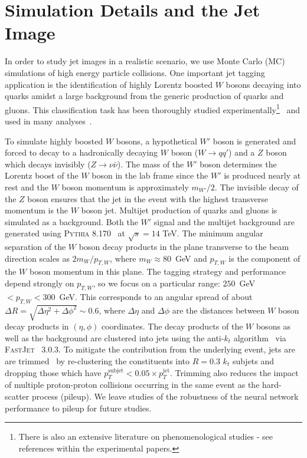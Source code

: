 \section{Simulation Details and the Jet Image}
\label{sec:simulation}

In order to study jet images in a realistic scenario, we use Monte Carlo (MC) simulations of high energy particle collisions. One important jet tagging application is the identification of highly Lorentz boosted $W$ bosons decaying into quarks amidst a large background from the generic production of quarks and gluons.  This classification task has been thoroughly studied experimentally\footnote{There is also an extensive literature on phenomenological studies - see references within the experimental papers.}~\cite{Khachatryan:2014vla,ATL-PHYS-PUB-2015-033,ATL-PHYS-PUB-2014-004} and used in many analyses~\cite{Aad:2015owa,Khachatryan:2014hpa,Khachatryan:2015mta,Khachatryan:2015oba,Khachatryan:2015gza,Khachatryan:2015bma,Khachatryan:2015cwa,Khachatryan:2015ywa,Aad:2014wea,Aad:2015agg,Aad:2015kna,Aad:2015ufa,Aad:2014haa}.  

To simulate highly boosted $W$ bosons, a hypothetical $W'$ boson is generated and forced to decay to a hadronically decaying $W$ boson ($W\rightarrow qq'$) and a $Z$ boson which decays invisibly ($Z\rightarrow \nu\bar{\nu}$).  The mass of the $W'$ boson determines the Lorentz boost of the $W$ boson in the lab frame since the $W'$ is produced nearly at rest and the $W$ boson momentum is approximately $m_{W'}/2$.  The invisible decay of the $Z$ boson ensures that the jet in the event with the highest transverse momentum is the $W$ boson jet.  Multijet production of quarks and gluons is simulated as a background.  Both the $W'$ signal and the multijet background are generated using \textsc{Pythia} 8.170~\cite{Pythia8,Pythia} at $\sqrt{s}=14$ TeV.  The minimum angular separation of the $W$ boson decay products in the plane transverse to the beam direction scales as $2m_{W}/p_{T,W}$, where $m_W\approx 80$~GeV and $p_{T,W}$ is the component of the $W$ boson momentum in this plane.  The tagging strategy and performance depend strongly on $p_{T,W}$, so we focus on a particular range: $250$~GeV~$<p_{T,W}<300$~GeV.  This corresponds to an angular spread of about $\Delta R = \sqrt{ \Delta \eta^2 + \Delta \phi^2} \sim 0.6$, where $\Delta \eta$ and $\Delta \phi$ are the distances between $W$ boson decay products in $(\eta, \phi)$ coordinates.  The decay products of the $W$ bosons as well as the background are clustered into jets using the anti-$k_t$ algorithm~\cite{antiktpaper} via \textsc{FastJet}~\cite{fastjet} 3.0.3.  To mitigate the contribution from the underlying event, jets are are trimmed~\cite{trimming} by re-clustering the constituents into $R=0.3$ $k_t$ subjets and dropping those which have $p_T^\text{subjet}<0.05\times p_T^\text{jet}$.  Trimming also reduces the impact of multiple proton-proton collisions occurring in the same event as the hard-scatter process (pileup).  We leave studies of the robustness of the neural network performance to pileup for future studies.

